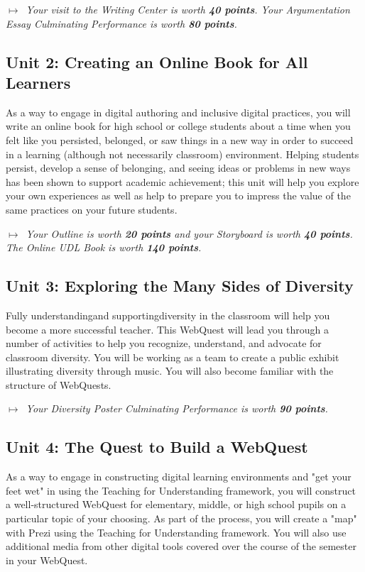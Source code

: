 \documentclass{tufte-handout}
\begin{document}
\medskip\noindent\textit{$\mapsto$~Your visit to the Writing Center is worth \textbf{40 points}. Your Argumentation Essay Culminating Performance is worth \textbf{80 points}.}

\subsection{Unit 2: Creating an Online Book for All Learners}

As a way to engage in digital authoring and inclusive digital practices, you will write an online book for high school or college students about a time when you felt like you persisted, belonged, or saw things in a new way in order to succeed in a learning (although not necessarily classroom) environment. Helping students persist, develop a sense of belonging, and seeing ideas or problems in new ways has been shown to support academic achievement; this unit will help you explore your own experiences as well as help to prepare you to impress the value of the same practices on your future students.

\medskip\noindent\textit{$\mapsto$~Your Outline is worth \textbf{20 points} and your Storyboard is worth \textbf{40 points}. The Online UDL Book is worth \textbf{140 points}.}

\subsection{Unit 3: Exploring the Many Sides of Diversity}

Fully understanding\textemdash{}and supporting\textemdash{}diversity in the classroom will help you become a more successful teacher. This WebQuest will lead you through a number of activities to help you recognize, understand, and advocate for classroom diversity. You will be working as a team to create a public exhibit illustrating diversity through music. You will also become familiar with the structure of WebQuests.

\medskip\noindent\textit{$\mapsto$~Your Diversity Poster Culminating Performance is worth \textbf{90 points}.}

\subsection{Unit 4: The Quest to Build a WebQuest}

As a way to engage in constructing digital learning environments and "get your feet wet" in using the Teaching for Understanding framework, you will construct a well-structured WebQuest for elementary, middle, or high school pupils on a particular topic of your choosing. As part of the process, you will create a "map" with Prezi using the Teaching for Understanding framework. You will also use additional media from other digital tools covered over the course of the semester in your WebQuest.
\end{document}
